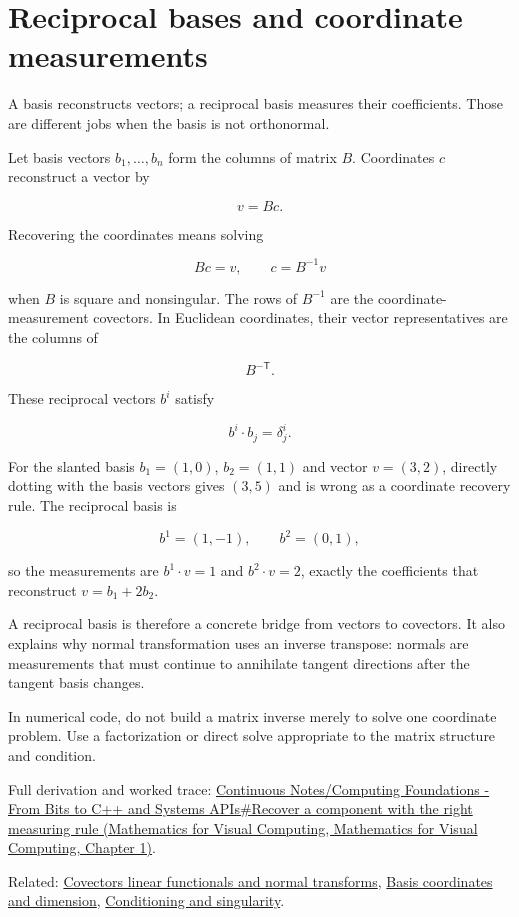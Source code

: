 \hypertarget{appendix-6b3d696dd902}{}\label{referencestart:appendix-6b3d696dd902}
\section{Reciprocal bases and coordinate measurements}\label{appendix-6b3d696dd902-reciprocal-bases-and-coordinate-measurements}

A basis reconstructs vectors; a reciprocal basis measures their coefficients. Those are different jobs when the basis is not orthonormal.

Let basis vectors \(b_1,\ldots,b_n\) form the columns of matrix \(B\). Coordinates \(c\) reconstruct a vector by

\[
v=Bc.
\]

Recovering the coordinates means solving

\[
Bc=v,
\qquad c=B^{-1}v
\]

when \(B\) is square and nonsingular. The rows of \(B^{-1}\) are the coordinate-measurement covectors. In Euclidean coordinates, their vector representatives are the columns of

\[
B^{-\mathsf T}.
\]

These reciprocal vectors \(b^i\) satisfy

\[
b^i\cdot b_j=\delta^i_j.
\]

For the slanted basis \(b_1=(1,0)\), \(b_2=(1,1)\) and vector \(v=(3,2)\), directly dotting with the basis vectors gives \((3,5)\) and is wrong as a coordinate recovery rule. The reciprocal basis is

\[
b^1=(1,-1),\qquad b^2=(0,1),
\]

so the measurements are \(b^1\cdot v=1\) and \(b^2\cdot v=2\), exactly the coefficients that reconstruct \(v=b_1+2b_2\).

A reciprocal basis is therefore a concrete bridge from vectors to covectors. It also explains why normal transformation uses an inverse transpose: normals are measurements that must continue to annihilate tangent directions after the tangent basis changes.

In numerical code, do not build a matrix inverse merely to solve one coordinate problem. Use a factorization or direct solve appropriate to the matrix structure and condition.

Full derivation and worked trace: \href{../02-Mathematics-for-Visual-Computing/main.pdf\#nameddest=01-foundations-i-ch017-recover-a-component-with-the-right-measuring-rule}{Continuous Notes/Computing Foundations - From Bits to C++ and Systems APIs\#Recover a component with the right measuring rule (Mathematics for Visual Computing, Mathematics for Visual Computing, Chapter 1)}.

Related: \hyperref[appendix-46da295c6787]{Covectors linear functionals and normal transforms}, \hyperref[appendix-ce0341f7ea0d]{Basis coordinates and dimension}, \hyperref[appendix-8f6a01f284a7]{Conditioning and singularity}.
